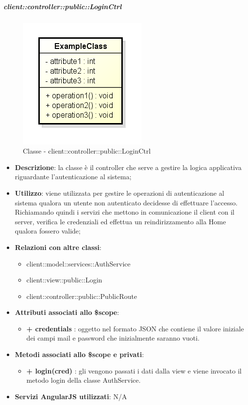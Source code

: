 		\subparagraph{client::controller::public::LoginCtrl} %
		\label{subp:bdsm_app_client_controller_public_loginctrl}
			\begin{figure}[htbp]
				\centering
				\centerline{\includegraphics[scale=0.7]{./images/client/classes/example_class.png}}
				\caption{Classe - client::controller::public::LoginCtrl}
			\end{figure}
			\begin{itemize}
				\item \textbf{Descrizione}: la classe è il controller che serve a gestire la logica applicativa riguardante l'autenticazione al sistema;
				\item \textbf{Utilizzo}: viene utilizzata per gestire le operazioni di autenticazione al sistema qualora un utente non autenticato decidesse di effettuare l'accesso. Richiamando quindi i servizi che mettono in comunicazione il client con il server, verifica le credenziali ed effettua un reindirizzamento alla Home qualora fossero valide;
				\item \textbf{Relazioni con altre classi}:
					\begin{itemize}
						\item client::model::services::AuthService
						\item client::view::public::Login
						\item client::controller::public::PublicRoute
					\end{itemize}

				\item \textbf{Attributi associati allo \$scope}:
					\begin{itemize}
						\item \textbf{+ credentials} : oggetto nel formato JSON che contiene il valore iniziale dei campi mail e password che inizialmente saranno vuoti.
					\end{itemize}

				\item \textbf{Metodi associati allo \$scope e privati}:
					\begin{itemize}
						\item \textbf{+ login(cred)} : gli vengono passati i dati dalla view e viene invocato il metodo login della classe AuthService.
					\end{itemize}

				\item \textbf{Servizi AngularJS utilizzati}: N/A

			\end{itemize}

